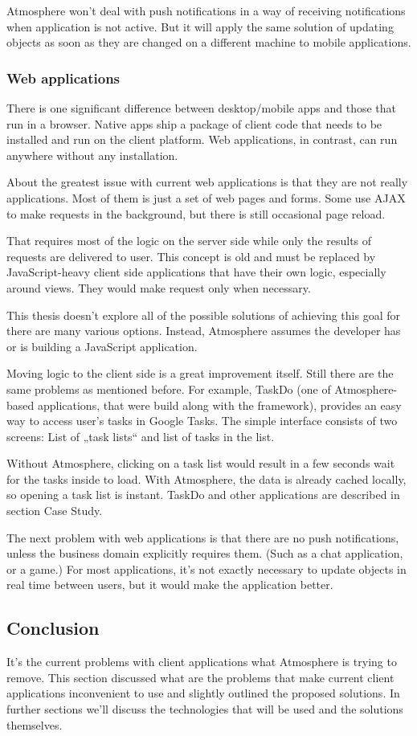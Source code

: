 Atmosphere won’t deal with push notifications in a way of receiving notifications when application is not active. But it will apply the same solution of updating objects as soon as they are changed on a different machine to mobile applications. 

\subsubsection{Web applications}

There is one significant difference between desktop/mobile apps and those that run in a browser. Native apps ship a package of client code that needs to be installed and run on the client platform. Web applications, in contrast, can run anywhere without any installation.

About the greatest issue with current web applications is that they are not really applications. Most of them is just a set of web pages and forms. Some use AJAX to make requests in the background, but there is still occasional page reload.

That requires most of the logic on the server side while only the results of requests are delivered to user. This concept is old and must be replaced by JavaScript-heavy client side applications that have their own logic, especially around views. They would make request only when necessary.

This thesis doesn’t explore all of the possible solutions of achieving this goal for there are many various options. Instead, Atmosphere assumes the developer has or is building a JavaScript application.

Moving logic to the client side is a great improvement itself. Still there are the same problems as mentioned before. For example, TaskDo (one of Atmosphere-based applications, that were build along with the framework), provides an easy way to access user’s tasks in Google Tasks. The simple interface consists of two screens: List of „task lists“ and list of tasks in the list.

Without Atmosphere, clicking on a task list would result in a few seconds wait for the tasks inside to load. With Atmosphere, the data is already cached locally, so opening a task list is instant. TaskDo and other applications are described in section Case Study.

The next problem with web applications is that there are no push notifications, unless the business domain explicitly requires them. (Such as a chat application, or a game.) For most applications, it’s not exactly necessary to update objects  in real time between users, but it would make the application better.

\subsection{Conclusion}

It’s the current problems with client applications what Atmosphere is trying to remove. This section discussed what are the problems that make current client applications inconvenient to use and slightly outlined the proposed solutions. In further sections we’ll discuss the technologies that will be used and the solutions themselves.